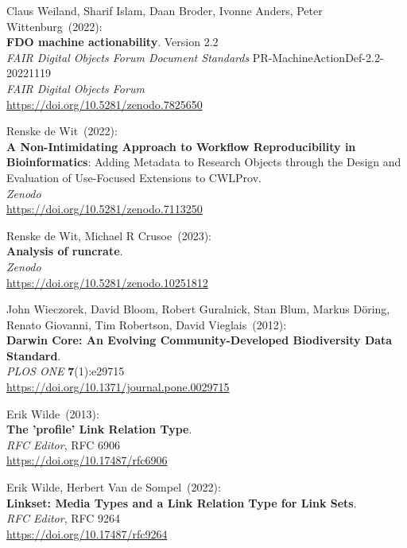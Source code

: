 \begin{thebibliography}{9}
Claus Weiland, Sharif Islam, Daan Broder, Ivonne Anders, Peter Wittenburg~(2022): \\
\textbf{{FDO} machine actionability}. Version 2.2 \\
\emph{{FAIR Digital Objects Forum Document Standards}} PR-MachineActionDef-2.2-20221119 \\
\emph{FAIR Digital Objects Forum} \\
\url{https://doi.org/10.5281/zenodo.7825650}

Renske de Wit~(2022): \\
\textbf{A Non-Intimidating Approach to Workflow Reproducibility in Bioinformatics}: Adding Metadata to Research Objects through the Design and Evaluation of Use-Focused Extensions to CWLProv.\\
\emph{Zenodo}\\
\url{https://doi.org/10.5281/zenodo.7113250}

Renske de Wit, Michael R Crusoe~(2023): \\
\textbf{Analysis of runcrate}.\\
\emph{Zenodo}\\
\url{https://doi.org/10.5281/zenodo.10251812}

John Wieczorek, David Bloom, Robert Guralnick, Stan Blum, Markus Döring,
Renato Giovanni, Tim Robertson, David Vieglais~(2012): \\
\textbf{Darwin {Core}: {An Evolving Community-Developed Biodiversity Data Standard}}.\\
\emph{PLOS ONE} \textbf{7}(1):e29715 \\
\url{https://doi.org/10.1371/journal.pone.0029715}

Erik Wilde~(2013): \\
\textbf{The 'profile' Link Relation Type}.\\
\emph{RFC Editor}, RFC 6906\\
\url{https://doi.org/10.17487/rfc6906}

Erik Wilde, Herbert Van de Sompel~(2022): \\
\textbf{Linkset: Media Types and a Link Relation Type for Link Sets}.\\
\emph{RFC Editor}, RFC 9264\\
\url{https://doi.org/10.17487/rfc9264}


\end{thebibliography}
